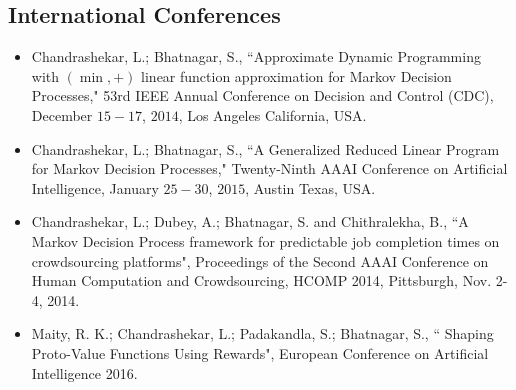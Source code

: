 \documentclass[line,margin]{res}
\begin{document}
\begin{resume}
\subsection{International Conferences}
\begin{itemize}
\item Chandrashekar, L.; Bhatnagar, S., ``Approximate Dynamic Programming with $(\min,+)$ linear function approximation for Markov Decision Processes," 53rd IEEE Annual Conference on Decision and Control (CDC), December $15-17$, $2014$, Los Angeles California, USA.
\item Chandrashekar, L.; Bhatnagar, S., ``A Generalized Reduced Linear Program for Markov Decision Processes," Twenty-Ninth AAAI Conference on Artificial Intelligence, January $25-30$, $2015$, Austin Texas, USA.
\item Chandrashekar, L.;  Dubey, A.; Bhatnagar, S. and Chithralekha, B., ``A Markov Decision Process framework for predictable job completion times on crowdsourcing platforms", Proceedings of the Second {AAAI} Conference on Human Computation and Crowdsourcing, {HCOMP} 2014, Pittsburgh, Nov. 2-4, 2014.
\item Maity, R. K.; Chandrashekar, L.;  Padakandla, S.; Bhatnagar, S., ``
Shaping Proto-Value Functions Using Rewards", European Conference on Artificial Intelligence 2016.
\end{itemize}



\end{resume}
\end{document}
